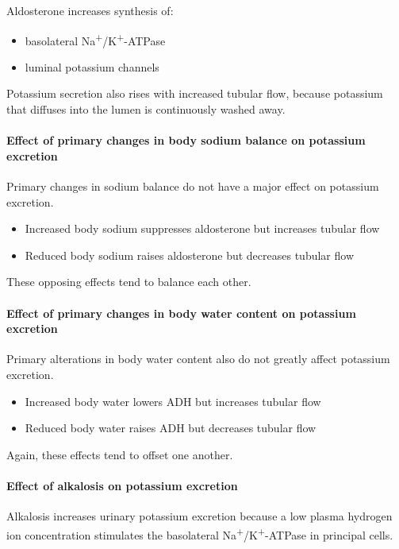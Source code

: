 \documentclass[11pt,a4paper]{article}
\begin{document}
Aldosterone increases synthesis of:
\begin{itemize}
    \item basolateral Na\textsuperscript{+}/K\textsuperscript{+}-ATPase
    \item luminal potassium channels
\end{itemize}

Potassium secretion also rises with increased tubular flow, because potassium that diffuses into the lumen is continuously washed away.

\paragraph{Effect of primary changes in body sodium balance on potassium excretion}

Primary changes in sodium balance do not have a major effect on potassium excretion.
\begin{itemize}
    \item Increased body sodium suppresses aldosterone but increases tubular flow
    \item Reduced body sodium raises aldosterone but decreases tubular flow
\end{itemize}

These opposing effects tend to balance each other.

\paragraph{Effect of primary changes in body water content on potassium excretion}

Primary alterations in body water content also do not greatly affect potassium excretion.
\begin{itemize}
    \item Increased body water lowers ADH but increases tubular flow
    \item Reduced body water raises ADH but decreases tubular flow
\end{itemize}

Again, these effects tend to offset one another.

\paragraph{Effect of alkalosis on potassium excretion}

Alkalosis increases urinary potassium excretion because a low plasma hydrogen ion concentration stimulates the basolateral Na\textsuperscript{+}/K\textsuperscript{+}-ATPase in principal cells.
\end{document}
